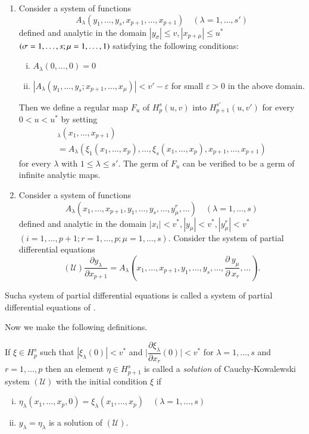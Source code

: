 \begin{enumerate}[(1)]
\item Consider a system of functions
  $$
  A_\lambda (y_1,  \ldots,  y_s,  x_{p+1},  \ldots,  x_{p+1}) \quad
  (\lambda = 1,  \ldots,  s') 
  $$
  defined and analytic in the domain $| y_\sigma | \leq v,  | x_{p +
    \mu } | \leq u^*$  $(\sigma = 1,\break  \ldots,  s ; \mu = 1,  \ldots,  1)$
  satisfying the following conditions:  
  \begin{enumerate}[(i)]
  \item $A_\lambda (0,  \ldots,  0) = 0$
  \item $| A_\lambda  (y_1,  \ldots,  y_s ; x_{p+1},  \ldots,  x_\mu)
    | < v' - \varepsilon$ for small $\varepsilon > 0$ in the above
    domain. 
  \end{enumerate}
  
  Then we define a regular map $F_u$ of $H^s_p(u, v)$ into
  $H^{s'}_{p+1}(u,  v')$ for every $0 < u < u^*$ by setting 
  \begin{multline*}
  [F_u ~ (\xi)]_\lambda (x_1,  \ldots,  x_{p+1})\\ 
  = A_\lambda (\xi_1(x_1,
  \ldots,  x_p),  \ldots,  \xi_s (x_1,  \ldots,  x_p),  x_{p+1},
  \ldots,  x_{p+1}) 
  \end{multline*}
  for every $\lambda$ with $1 \leq \lambda \leq s'$. The germ of $F_u$
  can be verified to be a germ of infinite analytic maps. 
\item Consider a system of functions
  $$
  A_\lambda (x_1,  \ldots,  x_{p+1},  y_1,  \ldots,  y_s,  \ldots,
  y^r_\mu,  \ldots) \quad (\lambda = 1,  \ldots,  s) 
  $$
  defined and analytic in the domain $| x_i | < v^*,  | y_\mu | < v^*,
  | y^r_\mu | < v^*$\break  $(i=1,  \ldots,  p+1; r=1,  \ldots,  p; \mu =1,
  \ldots,  s)$. Consider the system of partial differential equations 
  $$
  (\mathscr{U}) \frac{\partial y_\lambda}{\partial x_{p+1}} =
  A_\lambda \left(x_1,  \ldots,  x_{p+1},  y_1,  \ldots,  y_s,  \ldots,
  \frac{\partial ~y_\mu}{\partial ~ x_r},  \ldots\right). 
  $$
\end{enumerate}

Such\pageoriginale a system of partial differential equations is called a system of
partial differential equations of . 
 
Now we make the following definitions.

\begin{defi*}%
  If $\xi \in H^s_p$ such that $| \xi_\lambda (0) | < v^* $ and $\Big|
  \dfrac{\partial \xi_\lambda }{\partial x_r} (0) \Big| < v^*$ for
  $\lambda = 1,  \ldots,  s$  and $r =1,  \ldots,  p$ then an element
  $\eta \in H^s_{p+1}$ is called a {\em{solution}} of Cauchy-Kowalewski
  system $(\mathscr{U})$ with the initial condition $\xi$ if 
  \begin{enumerate}[(i)]
  \item $\eta_\lambda (x_1,  \ldots,  x_p,  0) = \xi_\lambda(x_1,
    \ldots,  x_p) \quad (\lambda = 1,  \ldots,  s)$ 
  \item $y_\lambda = \eta_\lambda$ is a solution of $(\mathscr{U})$.
  \end{enumerate}
\end{defi*}

